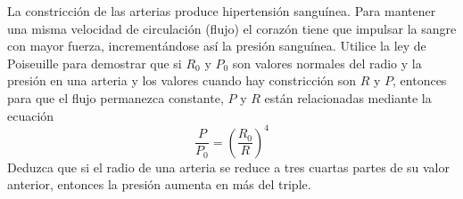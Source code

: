 \item La constricción de las arterias produce hipertensión sanguínea. Para mantener una misma velocidad de circulación (flujo) el corazón tiene que impulsar la sangre con mayor fuerza, incrementándose así la presión sanguínea. Utilice la ley de Poiseuille para demostrar que si $R_0$ y $P_0$ son valores normales del radio y la presión en una arteria y los valores cuando hay constricción son $R$ y $P$, entonces para que el flujo permanezca constante, $P$ y $R$ están relacionadas mediante la ecuación
    \[ \frac{P}{P_0} = \left(\frac{R_0}{R}\right)^4 \]
    Deduzca que si el radio de una arteria se reduce a tres cuartas partes de su valor anterior, entonces la presión aumenta en más del triple.
